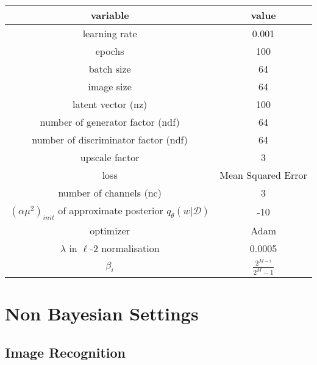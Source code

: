 \begin{table}[h!]
    \centering
    \renewcommand{\arraystretch}{2}
    \begin{tabular}[c]{c | c} 
     \hline
     variable & value \\ [0.5ex] 
     \hline
     learning rate &  0.001\\ 
     
     epochs & 100 \\
     
     batch size & 64 \\
     
     image size & 64 \\
     
     latent vector (nz) & 100 \\
     
     number of generator factor (ndf) & 64 \\
     
     number of discriminator factor (ndf) & 64 \\
     
     upscale factor & 3 \\
     
     loss & Mean Squared Error \\
     
     number of channels (nc) & 3 \\
     
     $(\alpha \mu^2)_{init}$ of approximate posterior $q_{\theta}(w|\mathcal{D})$ & -10 \\
     
     optimizer & Adam \cite{kingma2014adam} \\
     
     $\lambda$ in $\ell$-2 normalisation & 0.0005 \\
    
     $\beta_i$ & $\frac{2^{M-i}}{2^M-1}$ \cite{blundell2015weight} \\ [1ex] 
     \hline
    \end{tabular} 
    \renewcommand{\arraystretch}{2}
\end{table}

\section*{Non Bayesian Settings}

\subsection{Image Recognition}

